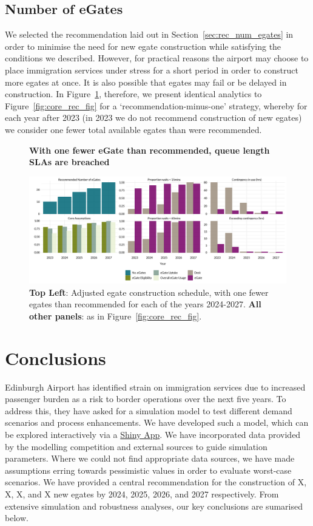 \documentclass[10pt]{article}
\newcommand*{\figuretitle}[1]{%
    {\centering%
    \textbf{#1}%
    \par\medskip}%
}
\begin{document}
\subsection{Number of eGates}
We selected the recommendation laid out in Section~\ref{sec:rec_num_egates} in order to minimise the need for new \gls{egate} construction while satisfying the conditions we described. However, for practical reasons the airport may choose to place immigration services under stress for a short period in order to construct more \glspl{egate} at once. It is also possible that \glspl{egate} may fail or be delayed in construction. In Figure~\ref{fig:minus_core_rec_fig}, therefore, we present identical analytics to Figure~\ref{fig:core_rec_fig} for a `recommendation-minus-one' strategy, whereby for each year after 2023 (in 2023 we do not recommend construction of new \glspl{egate}) we consider one fewer total available \glspl{egate} than were recommended.

\begin{figure}[!ht]
    \centering
    \figuretitle{With one fewer eGate than recommended, queue length SLAs are breached}
    \includegraphics[width=\textwidth]{figures/minus_core_rec_fig.png}
     \caption{\textbf{Top Left}: Adjusted \gls{egate} construction schedule, with one fewer \glspl{egate} than recommended for each of the years 2024-2027. \textbf{All other panels}: as in Figure~\ref{fig:core_rec_fig}.} \label{fig:minus_core_rec_fig}
\end{figure}

\section{Conclusions}
Edinburgh Airport has identified strain on immigration services due to increased passenger burden as a risk to border operations over the next five years. To address this, they have asked for a simulation model to test different demand scenarios and process enhancements. We have developed such a model, which can be explored interactively via a \href{https://github.com/cobrbra/immigration_queue_simulation_edinburgh_airport}{Shiny App}. We have incorporated data provided by the modelling competition and external sources to guide simulation parameters. Where we could not find appropriate data sources, we have made assumptions erring towards pessimistic values in order to evaluate worst-case scenarios. We have provided a central recommendation for the construction of X, X, X, and X new \glspl{egate} by 2024, 2025, 2026, and 2027 respectively. From extensive simulation and robustness analyses, our key conclusions are sumarised below.
\end{document}
